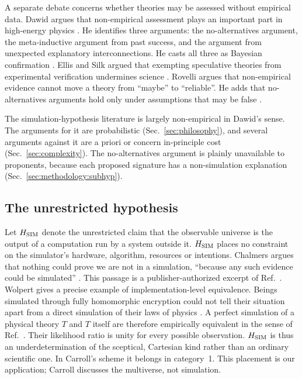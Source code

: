 A separate debate concerns whether theories may be assessed without empirical
data. Dawid argues that non-empirical assessment plays an important part in
high-energy physics \cite{Dawid2013string}. He identifies three arguments: the
no-alternatives argument, the meta-inductive argument from past success, and
the argument from unexpected explanatory interconnections. He casts all three
as Bayesian confirmation \cite{Dawid2019significance}. Ellis and Silk argued
that exempting speculative theories from experimental verification undermines
science \cite{Ellis2014scientific}. Rovelli argues that non-empirical evidence
cannot move a theory from ``maybe'' to ``reliable''. He adds that
no-alternatives arguments hold only under assumptions that may be false
\cite{Rovelli2019dangers}.

The simulation-hypothesis literature is largely non-empirical in Dawid's
sense. The arguments for it are probabilistic
(Sec.~\ref{sec:philosophy}), and several arguments against it are a priori or
concern in-principle cost (Sec.~\ref{sec:complexity}). The no-alternatives
argument is plainly unavailable to proponents, because each proposed signature
has a non-simulation explanation (Sec.~\ref{sec:methodology:subhyp}).

\subsection{The unrestricted hypothesis}
\label{sec:methodology:unrestricted}

Let $H_{\rm SIM}$ denote the unrestricted claim that the observable universe
is the output of a computation run by a system outside it. $H_{\rm SIM}$
places no constraint on the simulator's hardware, algorithm, resources or
intentions. Chalmers argues that nothing could prove we are not in a
simulation, ``because any such evidence could be simulated''
\cite{Chalmers2022can}. This passage is a publisher-authorized excerpt of
Ref.~\cite{Chalmers2022reality}. Wolpert gives a precise example of implementation-level
equivalence. Beings simulated through fully homomorphic encryption could not
tell their situation apart from a direct simulation of their laws of physics
\cite{Wolpert2025what}. A perfect simulation of a physical theory $T$ and $T$
itself are therefore empirically equivalent in the sense of
Ref.~\cite{Stanford2023underdetermination}. Their likelihood ratio is unity for
every possible observation. $H_{\rm SIM}$ is thus an underdetermination of the
sceptical, Cartesian kind rather than an ordinary scientific one. In Carroll's
scheme it belongs in category~1. This placement is our application; Carroll
discusses the multiverse, not simulation.

